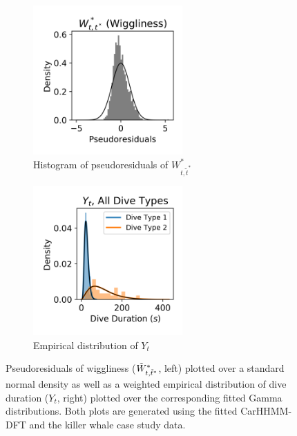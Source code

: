 \begin{figure}[ht]
    \begin{subfigure}{0.45\textwidth}
    	\centering
    	\includegraphics[width=2.25in]{../Plots/CarHHMM2_psedoresids_ahat.png}
    	\caption{Histogram of pseudoresiduals of $W^*_{t,\tilde t^*}$}
    	\label{fig:pseudoresids}
    \end{subfigure}
    \begin{subfigure}{0.45\textwidth}
    	\centering
    	\includegraphics[width=2.25in]{../Plots/CarHHMM2_empirical_hist_dive_duration.png}
    	\caption{Empirical distribution of $Y_t$}
    	\label{fig:empirical_dist}
    \end{subfigure}
    \caption{Pseudoresiduals of wiggliness ($\tilde{W}^*_{t,\tilde t^*}$, left) plotted over a standard normal density as well as a weighted empirical distribution of dive duration ($Y_t$, right) plotted over the corresponding fitted Gamma distributions. Both plots are generated using the fitted CarHHMM-DFT and the killer whale case study data.}
    \label{fig:model_checking}
\end{figure}


